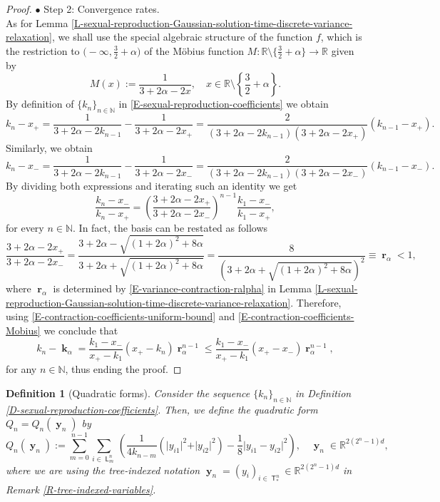 \documentclass[reqno]{amsart}
\newtheorem{definition}{Definition}[section]
\DeclareMathOperator{\Tree}{\mathsf{T}}
\DeclareMathOperator{\Level}{\mathsf{L}}
\DeclareMathOperator{\bk}{\boldsymbol{k}}
\DeclareMathOperator{\br}{\boldsymbol{r}}
\DeclareMathOperator{\by}{\mathbf{y}}
\numberwithin{equation}{section}
\begin{document}
{\begin{proof}
$\bullet$ {\sc Step 2}: Convergence rates.\\
As for Lemma \ref{L-sexual-reproduction-Gaussian-solution-time-discrete-variance-relaxation},  we shall use the special algebraic structure of the function $f$, which is the restriction to $\big(-\infty,\frac{3}{2}+\alpha\big)$ of the M\"{o}bius function $M:\mathbb{R}\setminus\{\frac{3}{2}+\alpha\}\longrightarrow \mathbb{R}$ given by
$$M(x):=\frac{1}{3+2\alpha-2x},\quad x\in \mathbb{R}\setminus\left\{\frac{3}{2}+\alpha\right\}.$$
By definition of $\{k_n\}_{n\in \mathbb{N}}$ in \eqref{E-sexual-reproduction-coefficients} we obtain
$$k_n-x_+=\frac{1}{3+2\alpha-2k_{n-1}}-\frac{1}{3+2\alpha-2x_+}=\frac{2}{(3+2\alpha-2k_{n-1})(3+2\alpha-2x_+)}(k_{n-1}-x_+).$$
Similarly, we obtain 
$$k_n-x_-=\frac{1}{3+2\alpha-2k_{n-1}}-\frac{1}{3+2\alpha-2x_-}=\frac{2}{(3+2\alpha-2k_{n-1})(3+2\alpha-2x_-)}(k_{n-1}-x_-).$$
By dividing both expressions and iterating such an identity we get
\begin{equation}\label{E-contraction-coefficients-Mobius}
\frac{k_n-x_-}{k_n-x_+}=\left(\frac{3+2\alpha-2x_+}{3+2\alpha-2x_-}\right)^{n-1}\frac{k_1-x_-}{k_1-x_+},
\end{equation}
for every $n\in \mathbb{N}$. In fact, the basis can be restated as follows
$$\frac{3+2\alpha-2x_+}{3+2\alpha-2x_-}=\frac{3+2\alpha-\sqrt{(1+2\alpha)^2+8\alpha}}{3+2\alpha+\sqrt{(1+2\alpha)^2+8\alpha}}=\frac{8}{\left(3+2\alpha+\sqrt{(1+2\alpha)^2+8\alpha}\right)^2}\equiv \br_\alpha<1,$$
where $\br_\alpha$ is determined by \eqref{E-variance-contraction-ralpha} in Lemma \ref{L-sexual-reproduction-Gaussian-solution-time-discrete-variance-relaxation}. Therefore, using \eqref{E-contraction-coefficients-uniform-bound} and \eqref{E-contraction-coefficients-Mobius} we conclude that
$$k_n-\bk_\alpha=\frac{k_1-x_-}{x_+-k_1}(x_+-k_n)\br_\alpha^{n-1}\leq \frac{k_1-x_-}{x_+-k_1}(x_+-x_-)\br_\alpha^{n-1},$$
for any $n\in \mathbb{N}$, thus ending the proof.
\end{proof}

\begin{definition}[Quadratic forms]\label{D-sexual-reproduction-Gaussian-quadratic-Qn-form}
Consider the sequence $\{k_n\}_{n\in \mathbb{N}}$ in Definition \ref{D-sexual-reproduction-coefficients}. Then, we define the quadratic form $Q_n=Q_n(\by_n)$ by
\begin{equation}\label{E-sexual-reproduction-Gaussian-quadratic-Qn-form}
Q_n(\by_n):=\sum_{m=0}^{n-1}\sum_{i\in \Level_m^n}\left(\frac{1}{4 k_{n-m}}(\vert y_{i1}\vert^2+\vert y_{i2}\vert^2)-\frac{1}{8}\vert y_{i1}-y_{i2}\vert^2\right),\quad \by_n\in \mathbb{R}^{2(2^n-1)d},
\end{equation}
where we are using the tree-indexed notation $\by_n=(y_i)_{i\in \Tree^n_*}\in \mathbb{R}^{2(2^n-1)d}$ in Remark \ref{R-tree-indexed-variables}.
\end{definition}

}
\end{document}
